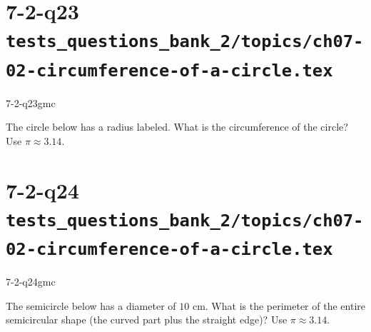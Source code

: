 \documentclass[12pt, fleqn, openany]{studyGuide}
\begin{document}
\newpage
\section*{7-2-q23 \hfill \normalsize\texttt{tests\_questions\_bank\_2/topics/ch07-02-circumference-of-a-circle.tex}}
\begin{practiceQuestion}{7-2-q23}{gmc}
\begin{questionText}
The circle below has a radius labeled. What is the circumference of the circle? Use $\pi \approx 3.14$.

\begin{center}
\end{center}
\end{questionText}
\end{practiceQuestion}

\newpage
\section*{7-2-q24 \hfill \normalsize\texttt{tests\_questions\_bank\_2/topics/ch07-02-circumference-of-a-circle.tex}}
\begin{practiceQuestion}{7-2-q24}{gmc}
\begin{questionText}
The semicircle below has a diameter of $10$ cm. What is the perimeter of the entire semicircular shape (the curved part plus the straight edge)? Use $\pi \approx 3.14$.

\begin{center}
\end{center}
\end{questionText}
\end{practiceQuestion}
\end{document}
